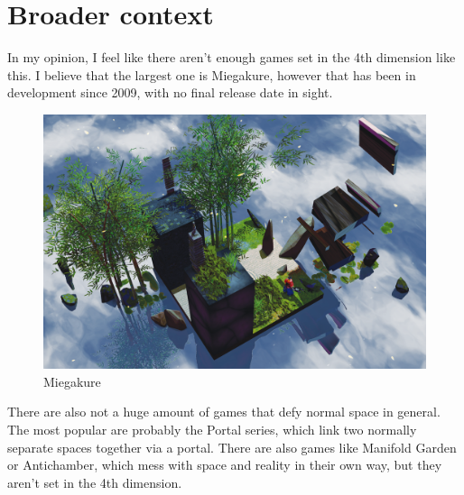 \documentclass[12pt]{article}
\begin{document}
\section{Broader context}
In my opinion, I feel like there aren't enough games set in the 4th dimension like this.
I believe that the largest one is Miegakure, however that has been in development since 2009, with no final release date in sight.\\
\begin{figure}
    \centering
    \includegraphics[width=\textwidth]{Media/Miegakure.png}
    \caption{Miegakure}
\end{figure}
There are also not a huge amount of games that defy normal space in general. The most popular are probably the Portal series, which link two normally separate spaces together via a portal.
There are also games like Manifold Garden or Antichamber, which mess with space and reality in their own way, but they aren't set in the 4th dimension.
\end{document}
